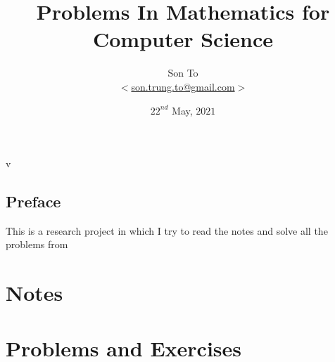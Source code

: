 \documentclass[a4paper,11pt]{memoir}
\newcommand{\fileVer}{}
\theoremstyle{plain} \newtheorem{lemNotes}{Lemma}[chapter]
\theoremstyle{definition} \newtheorem{pr}{Problem}[chapter]
\theoremstyle{remark}     \newtheorem{ab}{Remark}[chapter]
\theoremstyle{plain} \newtheorem{lemPr}{Lemma}[pr]
\begin{document}
    
    \title{Problems In Mathematics for Computer Science}
    \author{Son To\\
    $<$\href{mailto:son.trung.to@gmail.com}%
    {son.trung.to@gmail.com}$>$}
    \date{$22^{nd}$ May, $2021$}

    \maketitle
    \makeatletter
    \thispagestyle{empty}
    \begin{center}
        v\fileVer
    \end{center}
    \def\cleardoublepage{\clearpage\if@twoside
        \ifodd\c@page\else
            \hbox{}
            \vspace*{\fill}
            \begin{center}
                \doublenote
            \end{center}
            \vspace*{\fill}
            \thispagestyle{empty}
            \newpage
            \if@twocolumn\hbox{}\newpage\fi
        \fi
    \fi
    }
    \newcommand{\mylabel}[2]{#2\def\@currentlabel{#2}\label{#1}}
    \def\@endpart{\vfill\newpage
        \if@twoside
            \if@openright
                \null
                \thispagestyle{empty}
                \vspace*{\fill}
                \begin{quote}
                    \partnote
                \end{quote}
                \vspace*{\fill}
                \newpage
            \fi
        \fi
        \if@tempswa
            \twocolumn
        \fi
    }
    \newcommand{\partnote}{}
    \newcommand{\doublenote}{}
    \makeatother
    \frontmatter
        \chapter{Preface}
            This is a research project in which I try to read
            the notes and solve all the problems
            from \cite{lehman2018}
        \clearpage
        \tableofcontents

    \mainmatter
    \part{Notes}
        
        
    \part{Problems and Exercises}
        

    
    
\end{document}
